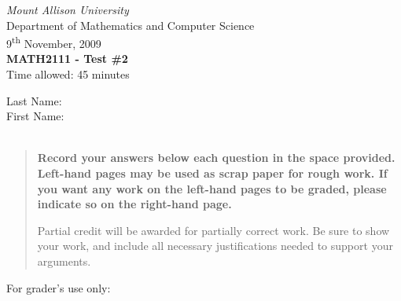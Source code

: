 \documentclass[12pt]{article}
\newcommand{\skipline}{\vspace{12pt}}
\begin{document}
\author{Sean Fitzpatrick}
\thispagestyle{plain}
\begin{center}
\emph{Mount Allison University}\\
Department of Mathematics and Computer Science\\
9\textsuperscript{th} November, 2009\\
{\bf MATH2111 - Test \#2}\\
Time allowed: 45 minutes
\end{center}
\skipline \skipline \skipline \noindent \skipline
Last Name:\underline{\hspace{350pt}}\\
\skipline
First Name:\underline{\hspace{348pt}}\\
\\

\vspace{2in}


\begin{quote}
 {\bf Record your answers below each question in the space provided.    Left-hand pages may be used as scrap paper for rough work.  If you want any work on the left-hand pages to be graded, please indicate so on the right-hand page.
 
 \bigskip
 
Partial credit will be awarded for partially correct work. Be sure to show your work, and include all necessary justifications needed to support your arguments.}
\end{quote}

\vspace{2in}

For grader's use only:
\end{document}
